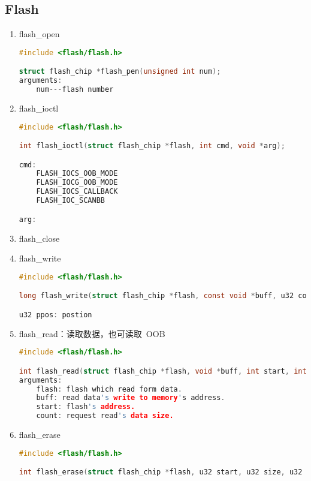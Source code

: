 \subsection{Flash}
\begin{enumerate}
\item flash\_open
\begin{lstlisting}[language=c, numbers=none]
#include <flash/flash.h>

struct flash_chip *flash_pen(unsigned int num);
arguments:
	num---flash number
\end{lstlisting}
\item flash\_ioctl
\begin{lstlisting}[language=c, numbers=none]
#include <flash/flash.h>

int flash_ioctl(struct flash_chip *flash, int cmd, void *arg);

cmd:
	FLASH_IOCS_OOB_MODE
	FLASH_IOCG_OOB_MODE
	FLASH_IOCS_CALLBACK
	FLASH_IOC_SCANBB

arg:

\end{lstlisting}
\item flash\_close
\item flash\_write
\begin{lstlisting}[language=c, numbers=none]
#include <flash/flash.h>

long flash_write(struct flash_chip *flash, const void *buff, u32 count, u32 ppos);

u32 ppos: postion
\end{lstlisting}
\item flash\_read：读取数据，也可读取~OOB~
\begin{lstlisting}[language=c, numbers=none]
#include <flash/flash.h>

int flash_read(struct flash_chip *flash, void *buff, int start, int count);
arguments:
	flash: flash which read form data.
	buff: read data's write to memory's address.
	start: flash's address.
	count: request read's data size.
\end{lstlisting}
\item flash\_erase
\begin{lstlisting}[language=c, numbers=none]
#include <flash/flash.h>

int flash_erase(struct flash_chip *flash, u32 start, u32 size, u32 flag);
\end{lstlisting}
\end{enumerate}


